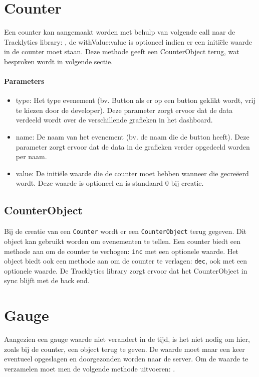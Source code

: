 \section{Counter}
Een counter kan aangemaakt worden met behulp van volgende call naar de Tracklytics library: \texttt{}, de withValue:value is optioneel indien er een initi\"ele waarde in de counter moet staan. Deze methode geeft een CounterObject terug, wat besproken wordt in volgende sectie. \\

\paragraph{Parameters}
\begin{itemize}
\item type: Het type evenement (bv. Button als er op een button geklikt wordt, vrij te kiezen door de developer). Deze parameter zorgt ervoor dat de data verdeeld wordt over de verschillende grafieken in het dashboard.
\item name: De naam van het evenement (bv. de naam die de button heeft). Deze parameter zorgt ervoor dat de data in de grafieken verder opgedeeld worden per naam.
\item value: De initi\"ele waarde die de counter moet hebben wanneer die gecre\"eerd wordt. Deze waarde is optioneel en is standaard 0 bij creatie.
\end{itemize}

\subsection{CounterObject}
Bij de creatie van een \texttt{Counter} wordt er een \texttt{CounterObject} terug gegeven. Dit object kan gebruikt worden om evenementen te tellen. Een counter biedt een methode aan om de counter te verhogen: \texttt{inc} met een optionele waarde. Het object biedt ook een methode aan om de counter te verlagen: \texttt{dec}, ook met een optionele waarde. De Tracklytics library zorgt ervoor dat het CounterObject in sync blijft met de back end. 


\section{Gauge}
Aangezien een gauge waarde niet verandert in de tijd, is het niet nodig om hier, zoals bij de counter, een object terug te geven. De waarde moet maar een keer eventueel opgeslagen en doorgezonden worden naar de server. Om de waarde te verzamelen moet men de volgende methode uitvoeren: \texttt{}. 

